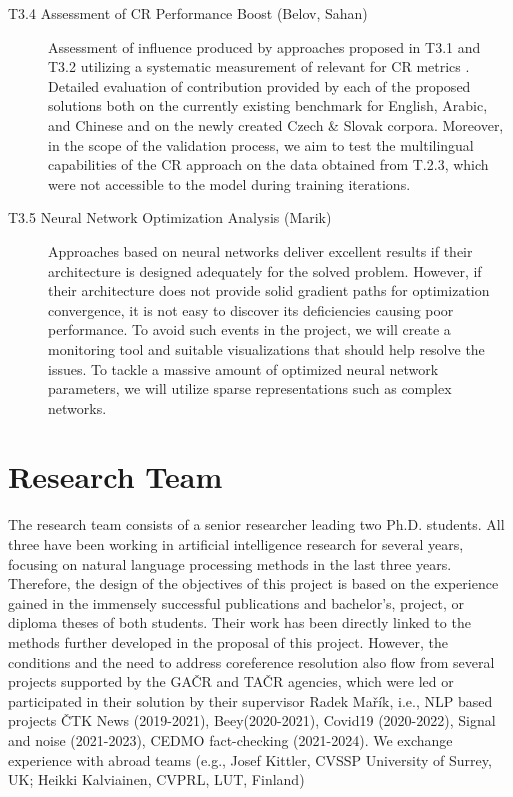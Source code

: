 \begin{description}
	\item  [T3.4 Assessment of CR Performance Boost (Belov, Sahan)]  Assessment of influence produced by approaches proposed in T3.1 and T3.2 utilizing a systematic measurement of relevant for CR metrics \cite{muc-Vilain1995,b3-Bagga1998,ceaf-Luo2005}. Detailed evaluation of contribution provided by each of the proposed solutions both on the currently existing benchmark for English, Arabic, and Chinese \cite{ontonotes5-Weischedel2013} and on the newly created Czech \& Slovak corpora. Moreover, in the scope of the validation process, we aim to test the multilingual capabilities of the CR approach on the data obtained from T.2.3, which were not accessible to the model during training iterations.
	
	\item [T3.5 Neural Network Optimization Analysis  (Marik)] Approaches based on neural networks deliver excellent results if their architecture is designed adequately for the solved problem. However, if their architecture does not provide solid gradient paths for optimization convergence, it is not easy to discover its deficiencies causing poor performance. To avoid such events in the project, we will create a monitoring tool and suitable visualizations that should help resolve the issues. To tackle a massive amount of optimized neural network parameters, we will utilize sparse representations such as complex networks.

\end{description}


\section{Research Team}\label{sec:research_team}

The research team consists of a senior researcher leading two Ph.D. students. All three have been working in artificial intelligence research for several years, focusing on natural language processing methods in the last three years. Therefore, the design of the objectives of this project is based on the experience gained in the immensely successful publications and bachelor's, project, or diploma theses of both students. Their work has been directly linked to the methods further developed in the proposal of this project. However, the conditions and the need to address coreference resolution also flow from several projects supported by the GAČR and TAČR agencies, which were led or participated in their solution by their supervisor Radek Mařík, i.e., NLP based projects ČTK News (2019-2021), Beey(2020-2021), Covid19 (2020-2022), Signal and noise (2021-2023), CEDMO fact-checking (2021-2024). We exchange experience with abroad teams (e.g., Josef Kittler, CVSSP University of Surrey, UK; Heikki Kalviainen, CVPRL, LUT, Finland)

